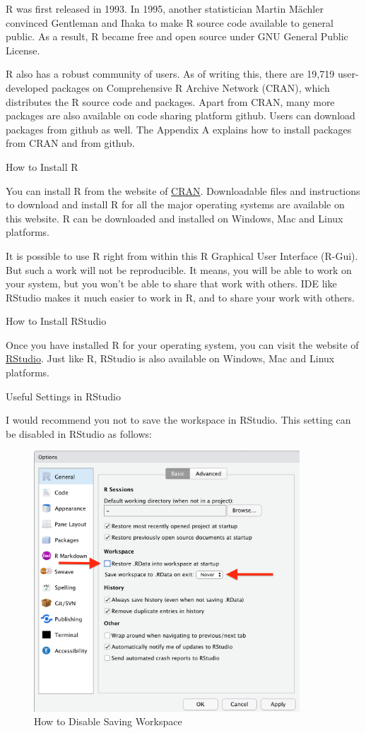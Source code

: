 \documentclass[
  letterpaper,
  twoside,
  openright,
  headsepline,
  footsepline,
  listof = totocnumbered,
  chapterprefix = true,
  titlepage = false]{scrbook}
\begin{document}
R was first released in 1993. In 1995, another statistician Martin
Mächler convinced Gentleman and Ihaka to make R source code available to
general public. As a result, R became free and open source under GNU
General Public License.

R also has a robust community of users. As of writing this, there are
19,719 user-developed packages on Comprehensive R Archive Network
(CRAN), which distributes the R source code and packages. Apart from
CRAN, many more packages are also available on code sharing platform
github. Users can download packages from github as well. The Appendix A
explains how to install packages from CRAN and from github.

How to Install R

You can install R from the website of
\href{https://cran.r-project.org/}{CRAN}. Downloadable files and
instructions to download and install R for all the major operating
systems are available on this website. R can be downloaded and installed
on Windows, Mac and Linux platforms.

It is possible to use R right from within this R Graphical User
Interface (R-Gui). But such a work will not be reproducible. It means,
you will be able to work on your system, but you won't be able to share
that work with others. IDE like RStudio makes it much easier to work in
R, and to share your work with others.

How to Install RStudio

Once you have installed R for your operating system, you can visit the
website of \href{https://posit.co/download/rstudio-desktop/}{RStudio}.
Just like R, RStudio is also available on Windows, Mac and Linux
platforms.

Useful Settings in RStudio

I would recommend you not to save the workspace in RStudio. This setting
can be disabled in RStudio as follows:

\begin{figure}

{\centering \includegraphics[width=3.92in,height=\textheight]{images/RStudio-settings.png}

}

\caption{\label{fig-disable-workspace}How to Disable Saving Workspace}

\end{figure}
\end{document}
